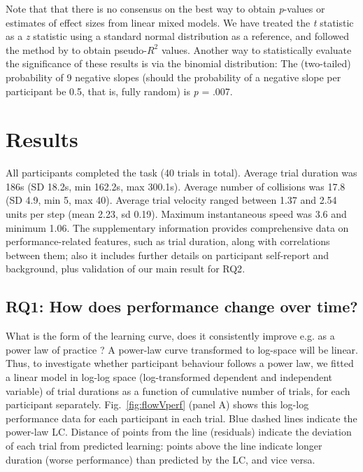 \documentclass{frontierstyle/frontiersSCNS}
\begin{document}
Note that that there is no consensus on the best way to obtain {\it p}-values or estimates of effect sizes from linear mixed models. We have treated the {\it t} statistic as a {\it z} statistic using a standard normal distribution as a reference, and followed the method by \cite{nakagawa2013general} to obtain pseudo-$R^2$ values. Another way to statistically evaluate the significance of these results is via the binomial distribution: The (two-tailed) probability of 9 negative slopes (should the probability of a negative slope per participant be 0.5, that is, fully random) is {\it p} = .007.



\section{Results}

All participants completed the task (40 trials in total). Average trial duration was 186s (SD 18.2s, min 162.2s, max 300.1s). Average number of collisions was 17.8 (SD 4.9, min 5, max 40). Average trial velocity ranged between 1.37 and 2.54 units per step (mean 2.23, sd 0.19). Maximum instantaneous speed was 3.6 and minimum 1.06. The supplementary information provides comprehensive data on performance-related features, such as trial duration, along with correlations between them; also it includes further details on participant self-report and background, plus validation of our main result for {\sf RQ2}.


\subsection{RQ1: How does performance change over time?}

What is the form of the learning curve, does it consistently improve e.g. as a power law of practice \citep{Newell1982}? A power-law curve transformed to log-space will be linear. Thus, to investigate whether participant behaviour follows a power law, we fitted a linear model in log-log space (log-transformed dependent and independent variable) of trial durations as a function of cumulative number of trials, for each participant separately. Fig.~\ref{fig:flowVperf} (panel A) shows this log-log performance data for each participant in each trial. Blue dashed lines indicate the power-law LC. Distance of points from the line (residuals) indicate the deviation of each trial from predicted learning: points above the line indicate longer duration (worse performance) than predicted by the LC, and vice versa.
\end{document}
